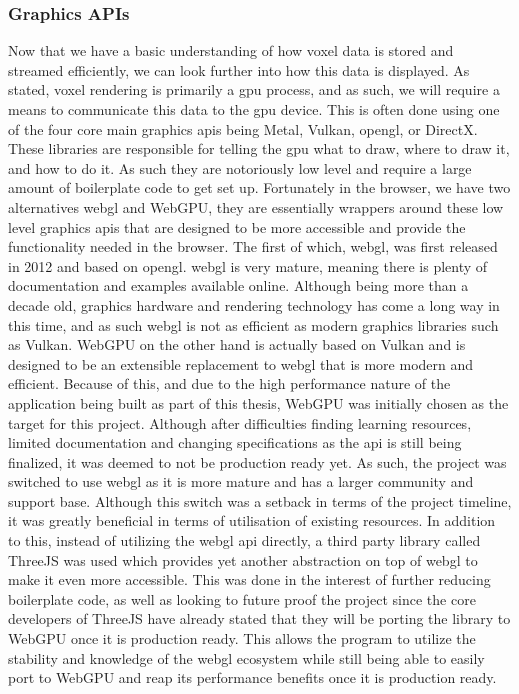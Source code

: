 \documentclass[titlepage]{article}
\begin{document}
\subsubsection{Graphics APIs}
Now that we have a basic understanding of how voxel data is stored and streamed efficiently, we can look further into how this data is displayed. As stated, voxel rendering is primarily a \gls{gpu} process, and as such, we will require a means to communicate this data to the \gls{gpu} device. This is often done using one of the four core main graphics \glspl{api} being Metal, Vulkan, \gls{opengl}, or DirectX. These libraries are responsible for telling the \gls{gpu} what to draw, where to draw it, and how to do it. As such they are notoriously low level and require a large amount of boilerplate code to get set up. Fortunately in the browser, we have two alternatives \gls{webgl} and WebGPU, they are essentially wrappers around these low level graphics \glspl{api} that are designed to be more accessible and provide the functionality needed in the browser. The first of which, \gls{webgl}, was first released in 2012 and based on \gls{opengl}. \gls{webgl} is very mature, meaning there is plenty of documentation and examples available online. Although being more than a decade old, graphics hardware and rendering technology has come a long way in this time, and as such \gls{webgl} is not as efficient as modern graphics libraries such as Vulkan. WebGPU on the other hand is actually based on Vulkan and is designed to be an extensible replacement to \gls{webgl} that is more modern and efficient. Because of this, and due to the high performance nature of the application being built as part of this thesis, WebGPU was initially chosen as the target for this project. Although after difficulties finding learning resources, limited documentation and changing specifications as the \gls{api} is still being finalized, it was deemed to not be production ready yet. As such, the project was switched to use \gls{webgl} as it is more mature and has a larger community and support base. Although this switch was a setback in terms of the project timeline, it was greatly beneficial in terms of utilisation of existing resources. In addition to this, instead of utilizing the \gls{webgl} \gls{api} directly, a third party library called ThreeJS was used which provides yet another abstraction on top of \gls{webgl} to make it even more accessible. This was done in the interest of further reducing boilerplate code, as well as looking to future proof the project since the core developers of ThreeJS have already stated that they will be porting the library to WebGPU once it is production ready. This allows the program to utilize the stability and knowledge of the \gls{webgl} ecosystem while still being able to easily port to WebGPU and reap its performance benefits once it is production ready.
\end{document}
